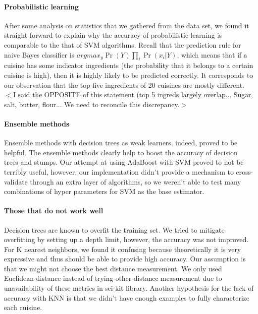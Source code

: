 \paragraph{Probabilistic learning} After some analysis on statistics
that we gathered from the data set, we found it straight forward to
explain why the accuracy of probabilistic learning is comparable to
the that of SVM algorithms. Recall that the prediction rule for naive Bayes
classifier is $argmax_y \Pr(Y)\prod_{i} \Pr(x_i|Y)$, which means that
if a cuisine has some indicator ingredients (the probability that it
belongs to a certain cuisine is high), then it is highly likely to be
predicted correctly. It corresponds to our observation that the top
five ingredients of 20 cuisines are mostly different. $<$I said the
OPPOSITE of this statement (top 5 ingreds largely overlap...  Sugar,
salt, butter, flour...  We need to reconcile this discrepancy.$>$
 
\paragraph{Ensemble methods} Ensemble methods with decision trees as
weak learners, indeed, proved to be helpful.  The ensemble methods
clearly help to boost the accuracy of decision trees and stumps.  Our
attempt at using AdaBoost with SVM proved to not be terribly useful,
however, our implementation didn't provide a mechanism to
cross-validate through an extra layer of algorithms, so we weren't
able to test many combinations of hyper parameters for SVM as the base
estimator.  


\paragraph{Those that do not work well} Decision trees are known to
overfit the training set. We tried to mitigate overfitting by setting
up a depth limit, however, the accuracy was not improved. For K nearest
neighbors, we found it confusing because theoretically it is very
expressive and thus should be able to provide high accuracy. Our
assumption is that we might not choose the best distance
measurement. We only used Euclidean distance instead of trying other
distance measurement due to unavailability of these metrics in sci-kit
library.  Another hypothesis for the lack of accuracy with KNN is that
we didn't have enough examples to fully characterize each cuisine.